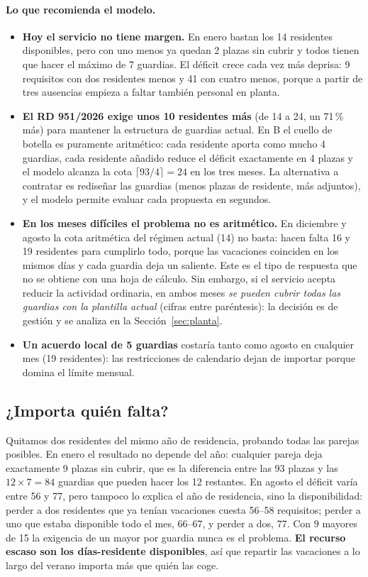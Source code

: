 \paragraph{Lo que recomienda el modelo.}
\begin{itemize}
  \item \textbf{Hoy el servicio no tiene margen.} En enero bastan los 14 residentes disponibles, pero con uno menos ya quedan 2 plazas sin cubrir y todos tienen que hacer el máximo de 7 guardias. El déficit crece cada vez más deprisa: 9 requisitos con dos residentes menos y 41 con cuatro menos, porque a partir de tres ausencias empieza a faltar también personal en planta.
  \item \textbf{El RD 951/2026 exige unos 10 residentes más} (de 14 a 24, un 71\,\% más) para mantener la estructura de guardias actual. En B el cuello de botella es puramente aritmético: cada residente aporta como mucho 4 guardias, cada residente añadido reduce el déficit exactamente en 4 plazas y el modelo alcanza la cota $\lceil 93/4 \rceil = 24$ en los tres meses. La alternativa a contratar es rediseñar las guardias (menos plazas de residente, más adjuntos), y el modelo permite evaluar cada propuesta en segundos.
  \item \textbf{En los meses difíciles el problema no es aritmético.} En diciembre y agosto la cota aritmética del régimen actual (14) no basta: hacen falta 16 y 19 residentes para cumplirlo todo, porque las vacaciones coinciden en los mismos días y cada guardia deja un saliente. Este es el tipo de respuesta que no se obtiene con una hoja de cálculo. Sin embargo, si el servicio acepta reducir la actividad ordinaria, en ambos meses \emph{se pueden cubrir todas las guardias con la plantilla actual} (cifras entre paréntesis): la decisión es de gestión y se analiza en la Sección~\ref{sec:planta}.
  \item \textbf{Un acuerdo local de 5 guardias} costaría tanto como agosto en cualquier mes (19 residentes): las restricciones de calendario dejan de importar porque domina el límite mensual.
\end{itemize}

\subsection{¿Importa quién falta?}

Quitamos dos residentes del mismo año de residencia, probando todas las parejas posibles. En enero el resultado no depende del año: cualquier pareja deja exactamente 9 plazas sin cubrir, que es la diferencia entre las 93 plazas y las $12 \times 7 = 84$ guardias que pueden hacer los 12 restantes. En agosto el déficit varía entre 56 y 77, pero tampoco lo explica el año de residencia, sino la disponibilidad: perder a dos residentes que ya tenían vacaciones cuesta 56--58 requisitos; perder a uno que estaba disponible todo el mes, 66--67, y perder a dos, 77. Con 9 mayores de 15 la exigencia de un mayor por guardia nunca es el problema. \textbf{El recurso escaso son los días-residente disponibles}, así que repartir las vacaciones a lo largo del verano importa más que quién las coge.

